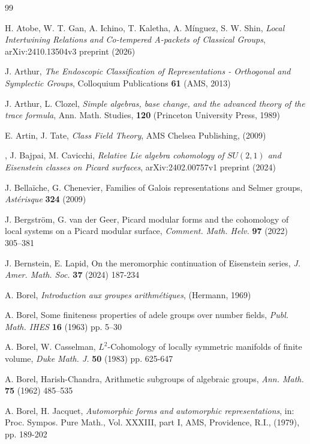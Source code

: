 \begin{thebibliography}{99}

 H. Atobe, W. T. Gan, A. Ichino, T. Kaletha, A. Mínguez, S. W. Shin, {\it Local Intertwining Relations and Co-tempered A-packets of Classical Groups}, arXiv:2410.13504v3 preprint (2026)


 J. Arthur, {\it The Endoscopic Classification of Representations - Orthogonal and Symplectic Groups}, Colloquium Publications {\bf 61} (AMS, 2013)

 J. Arthur, L. Clozel, {\it Simple algebras, base change, and the advanced theory of the trace formula}, Ann. Math. Studies, {\bf 120} (Princeton University Press, 1989)

 E. Artin, J. Tate, \emph{Class Field Theory}, AMS Chelsea Publishing, (2009)

, J. Bajpai, M. Cavicchi, {\it Relative Lie algebra cohomology of $SU(2,1)$ and Eisenstein classes on Picard surfaces}, arXiv:2402.00757v1 preprint (2024)

 J. Bella\"iche, G. Chenevier, Families of Galois representations and Selmer groups, {\it Ast\'erisque} {\bf 324} (2009)

 J. Bergström, G. van der Geer, Picard modular forms and the cohomology of local systems on a Picard modular surface, {\it Comment. Math. Helv.} {\bf 97} (2022) 305--381

 J. Bernstein, E. Lapid, On the meromorphic continuation of Eisenstein series, {\it J. Amer. Math. Soc.} {\bf 37} (2024) 187-234

 A. Borel, {\it Introduction aux groupes arithm\'etiques}, (Hermann, 1969)

 A. Borel, Some finiteness properties of adele groups over number fields, {\it Publ. Math. IHES} {\bf 16} (1963) pp. 5--30

 A. Borel, W. Casselman, $L^2$-Cohomology of locally symmetric manifolds of finite volume, {\it Duke Math. J.} \textbf{50} (1983) pp. 625-647

 A. Borel, Harish-Chandra, Arithmetic subgroups of algebraic groups, {\it Ann. Math.} {\bf 75} (1962) 485--535

 A. Borel, H. Jacquet, {\it Automorphic forms and automorphic representations}, in: Proc. Sympos. Pure Math., Vol. XXXIII, part I, AMS, Providence, R.I., (1979), pp. 189-202


\end{thebibliography}
